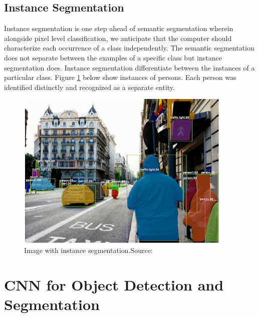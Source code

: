 \subsection{
Instance Segmentation
}
Instance segmentation is one step ahead of semantic segmentation wherein alongside pixel level classification, we anticipate that the computer should characterize each occurrence of a class independently.  The semantic segmentation does not separate between the examples of a specific class but instance segmentation does. Instance segmentation differentiate between the instances of a particular class. Figure \ref{fig:instance} below show instances of persons. Each person was identified distinctly and recognized as a separate entity.


\begin{figure}[H]
  \centering
  \includegraphics[height=3in]{images/instance.png}
   \caption{Image with instance segmentation.Source:\cite{L}}
   \label{fig:instance}
\end{figure}

\section{CNN for Object Detection and  Segmentation }
